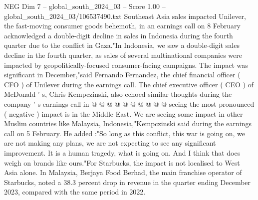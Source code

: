 \begin{textsample}{NEG Dim 7 – global\_south\_2024\_03 – Score 1.00 – global\_south\_2024\_03/106537490.txt}
Southeast Asia sales impacted Unilever, the fast-moving consumer goods behemoth, in an earnings call on 8 February acknowledged a double-digit decline in sales in Indonesia during the fourth quarter due to the conflict in Gaza."In Indonesia, we saw a double-digit sales decline in the fourth quarter, as sales of several multinational companies were impacted by geopolitically-focused consumer-facing campaigns.
The impact was significant in December,"said Fernando Fernandez, the chief financial officer ( CFO ) of Unilever during the earnings call.
The chief executive officer ( CEO ) of McDonald ' s, Chris Kempczinski, also echoed similar thoughts during the company ' s earnings call in @ @ @ @ @ @ @ @ @ @ seeing the most pronounced ( negative ) impact is in the Middle East.
We are seeing some impact in other Muslim countries like Malaysia, Indonesia,"Kempczinski said during the earnings call on 5 February.
He added :"So long as this conflict, this war is going on, we are not making any plans, we are not expecting to see any significant improvement.
It is a human tragedy, what is going on.
And I think that does weigh on brands like ours."For Starbucks, the impact is not localised to West Asia alone.
In Malaysia, Berjaya Food Berhad, the main franchise operator of Starbucks, noted a 38.3 percent drop in revenue in the quarter ending December 2023, compared with the same period in 2022.

\end{textsample}
